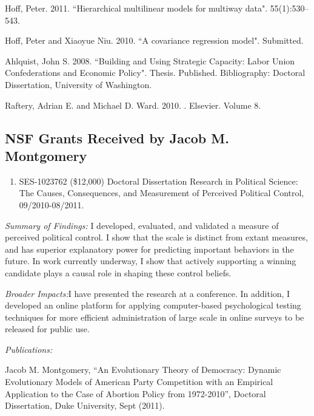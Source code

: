 \documentclass[pdftex,12pt,fullpage,oneside]{amsart}
\begin{document}
\begin{list}{}{\leftmargin=1em}
\item Hoff, Peter. 2011. ``Hierarchical multilinear models for multiway
  data".  55(1):530--543.

\item Hoff, Peter and Xiaoyue Niu. 2010. ``A covariance regression model".  Submitted.


\item  Ahlquist, John S. 2008. ``Building and Using Strategic Capacity: Labor Union Confederations and Economic Policy". Thesis. Published. %
Bibliography: Doctoral Dissertation, University of Washington.

\item  Raftery, Adrian E. and Michael D. Ward. 2010. . %
Elsevier. Volume 8.
\end{list}

 \subsection{NSF Grants Received by Jacob M. Montgomery}
\begin{enumerate}
\item SES-1023762  (\$12,000) Doctoral Dissertation Research in Political Science: The Causes, Consequences, and Measurement of Perceived Political Control, 09/2010-08/2011.    
\end{enumerate}

\textit{Summary of Findings:} I developed, evaluated, and validated a
measure of perceived political control. I show that the scale is
distinct from extant measures, and has superior explanatory power for
predicting important behaviors in the future. In work currently
underway, I show that actively supporting a winning candidate plays a
causal role in shaping these control beliefs.

\textit{Broader Impacts:}I have presented the research at a
conference.  In addition, I developed an online platform for applying
computer-based psychological testing techniques for more efficient
administration of large scale in online surveys to be released for
public use.

\textit{Publications:}

\begin{list}{}{\leftmargin=1em} \small
\item Jacob M. Montgomery, ``An Evolutionary Theory of Democracy:
  Dynamic Evolutionary Models of American Party Competition with an
  Empirical Application to the Case of Abortion Policy from
  1972-2010'', Doctoral Dissertation, Duke University, Sept (2011).
\end{list}
\end{document}

